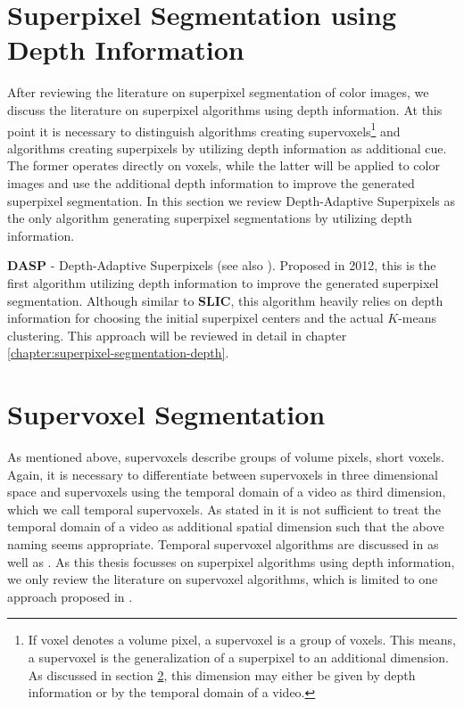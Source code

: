 \section{Superpixel Segmentation using Depth Information}
\label{section:related-work-superpixel-segmentation-using-depth}

After reviewing the literature on superpixel segmentation of color images, we discuss the literature on superpixel algorithms using depth information. At this point it is necessary to distinguish algorithms creating supervoxels\footnote{If voxel denotes a volume pixel, a supervoxel is a group of voxels. This means, a supervoxel is the generalization of a superpixel to an additional dimension. As discussed in section \ref{section:section:related-work-supervoxel-segmentation}, this dimension may either be given by depth information or by the temporal domain of a video.} and algorithms creating superpixels by utilizing depth information as additional cue. The former operates directly on voxels, while the latter will be applied to color images and use the additional depth information to improve the generated superpixel segmentation. In this section we review Depth-Adaptive Superpixels \cite{WeikersdorferSchickCremers:2013} as the only algorithm generating superpixel segmentations by utilizing depth information.

\textbf{DASP} - Depth-Adaptive Superpixels \cite{WeikersdorferSchickCremers:2013} (see also \cite{Weikersdorfer:2014}). Proposed in 2012, this is the first algorithm utilizing depth information to improve the generated superpixel segmentation. Although similar to \textbf{SLIC}, this algorithm heavily relies on depth information for choosing the initial superpixel centers and the actual $K$-means clustering. This approach will be reviewed in detail in chapter \ref{chapter:superpixel-segmentation-depth}.

\section{Supervoxel Segmentation}
\label{section:section:related-work-supervoxel-segmentation}

As mentioned above, supervoxels describe groups of volume pixels, short voxels. Again, it is necessary to differentiate between supervoxels in three dimensional space and supervoxels using the temporal domain of a video as third dimension, which we call temporal supervoxels. As stated in \cite{ResoJachalskyRosenhahnOstermann:2013} it is not sufficient to treat the temporal domain of a video as additional spatial dimension such that the above naming seems appropriate. Temporal supervoxel algorithms are discussed in \cite{ResoJachalskyRosenhahnOstermann:2013, ChangDonglaiWeiFisher:2013} as well as \cite{HuazhuFuXiaochunCaoDaiTangYahongHanDongXu:2014}. As this thesis focusses on superpixel algorithms using depth information, we only review the literature on supervoxel algorithms, which is limited to one approach proposed in \cite{PaponAbramovSchoelerWoergoetter:2013}.

